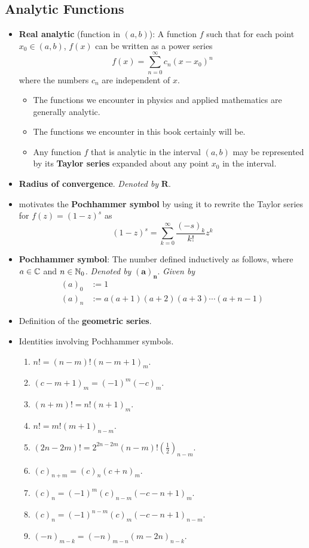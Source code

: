 \documentclass[../finalProject.tex]{subfiles}
\begin{document}
\subsection{Analytic Functions}\label{sss:2.2}
\begin{itemize}
    \item \textbf{Real analytic} (function in $(a,b)$): A function $f$ such that for each point $x_0\in(a,b)$, $f(x)$ can be written as a power series
    \begin{equation*}
        f(x) = \sum_{n=0}^\infty c_n(x-x_0)^n
    \end{equation*}
    where the numbers $c_n$ are independent of $x$.
    \begin{itemize}
        \item The functions we encounter in physics and applied mathematics are generally analytic.
        \item The functions we encounter in this book certainly will be.
        \item Any function $f$ that is analytic in the interval $(a,b)$ may be represented by its \textbf{Taylor series} expanded about any point $x_0$ in the interval.
    \end{itemize}
    \item \textbf{Radius of convergence}. \emph{Denoted by} $\bm{R}$.
    \item \textcite{bib:Seaborn} motivates the \textbf{Pochhammer symbol} by using it to rewrite the Taylor series for $f(z)=(1-z)^s$ as
    \begin{equation*}
        (1-z)^s = \sum_{k=0}^\infty\frac{(-s)_k}{k!}z^k
    \end{equation*}
    \item \textbf{Pochhammer symbol}: The number defined inductively as follows, where $a\in\mathbb{C}$ and $n\in\mathbb{N}_0$. \emph{Denoted by} $\bm{(a)_n}$. \emph{Given by}
    \begin{align*}
        (a)_0 &:= 1\\
        (a)_n &:= a(a+1)(a+2)(a+3)\cdots(a+n-1)\tag{$n=1,2,3,\dots$}
    \end{align*}
    \item Definition of the \textbf{geometric series}.
    \item Identities involving Pochhammer symbols.
    \begin{enumerate}
        \item $n!=(n-m)!(n-m+1)_m$.
        \item $(c-m+1)_m=(-1)^m(-c)_m$.
        \item $(n+m)!=n!(n+1)_m$.
        \item $n!=m!(m+1)_{n-m}$.
        \item $(2n-2m)!=2^{2n-2m}(n-m)!(\frac{1}{2})_{n-m}$.
        \item $(c)_{n+m}=(c)_n(c+n)_m$.
        \item $(c)_n=(-1)^m(c)_{n-m}(-c-n+1)_m$.
        \item $(c)_n=(-1)^{n-m}(c)_m(-c-n+1)_{n-m}$.
        \item $(-n)_{m-k}=(-n)_{m-n}(m-2n)_{n-k}$.
    \end{enumerate}
\end{itemize}
\end{document}
